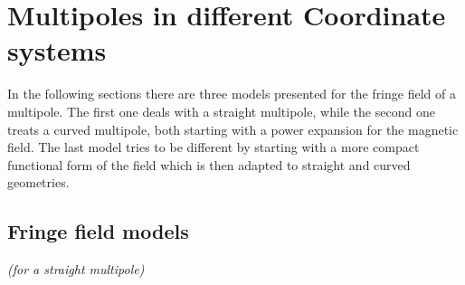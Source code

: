 \section{Multipoles in different Coordinate systems}

In the following sections there are three models presented for the fringe field of a multipole. The first one deals with a straight multipole, while the second one treats a curved multipole, both starting with a power expansion for the magnetic field. The last model tries to be different by starting with a more compact functional form of the field which is then adapted to straight and curved geometries. 

\subsection{Fringe field models}
\textit{(for a straight multipole)}

